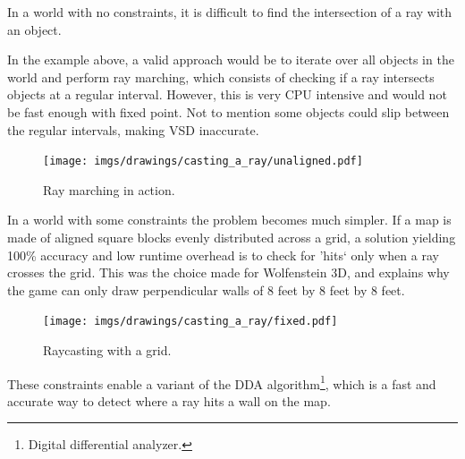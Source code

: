 In a world with no constraints, it is difficult to find the intersection of a ray with an object.\\
\par
In the example above, a valid approach would be to iterate over all objects in the world and perform ray marching, which consists of checking if a ray intersects objects at a regular interval. However, this is very CPU intensive and would not be fast enough with fixed point. Not to mention some objects could slip between the regular intervals, making VSD inaccurate.
\begin{figure}[H]
\centering
\texttt{[image: imgs/drawings/casting\_a\_ray/unaligned.pdf]}
 \caption{Ray marching in action.}
\end{figure}


In a world with some constraints the problem becomes much simpler. If a map is made of aligned square blocks evenly distributed across a grid, a solution yielding 100\% accuracy and low runtime overhead is to check for 'hits` only when a ray crosses the grid. This was the choice made for Wolfenstein 3D, and explains why the game can only draw perpendicular walls of 8 feet by 8 feet by 8 feet.\\
\par
\begin{figure}[H]
\centering
\texttt{[image: imgs/drawings/casting\_a\_ray/fixed.pdf]}
 \caption{Raycasting with a grid.}
\end{figure}
\par
These constraints enable a variant of the DDA algorithm\footnote{Digital differential analyzer.}, which is a fast and accurate way to detect where a ray hits a wall on the map.
\par
